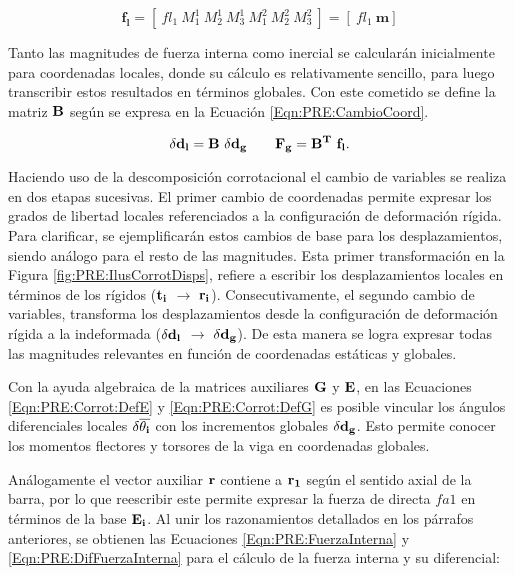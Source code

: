 \begin{equation}\label{Eqn:PRE:FuerzElem}
\boldsymbol{f_l} =[~fl_1 ~M^1_1~ M^1_2~ M^1_3~ M^2_1~ M^2_2~ M^2_3~] = [~fl_1~\boldsymbol{m}]
\end{equation}

Tanto las magnitudes de fuerza interna como inercial se calcularán inicialmente para coordenadas locales, donde su cálculo es relativamente sencillo, para luego transcribir estos resultados en términos globales. Con este cometido se define la matriz $\bf{B}$ según se expresa en la Ecuación \eqref{Eqn:PRE:CambioCoord}. 

\begin{equation}\label{Eqn:PRE:CambioCoord}
	\bf{\delta d_l}=\bf{B}~\bf{\delta d_g} ~~~~~~ \bf{ F_g}=\bf{B}^T~\bf{ f_l}.
\end{equation}


Haciendo uso de la descomposición corrotacional el cambio de variables se realiza en dos etapas sucesivas. El primer cambio de coordenadas permite expresar los grados de libertad locales referenciados a la configuración de deformación rígida. Para clarificar, se ejemplificarán estos cambios de base para los desplazamientos, siendo análogo para el resto de las magnitudes. Esta primer transformación en la Figura \ref{fig:PRE:IlusCorrotDisps}, refiere a escribir los desplazamientos locales en términos de los rígidos ($\bf{t_i}$ $\rightarrow$ $\bf{r_i}$). Consecutivamente, el segundo cambio de variables, transforma los desplazamientos desde la configuración de deformación rígida a la indeformada ($\delta \bf{d_l}$ $\rightarrow$ $\delta \bf{d_g}$). De esta manera se logra expresar todas las magnitudes relevantes en función de coordenadas estáticas y globales. 

Con la ayuda algebraica de la matrices auxiliares $\bf{G}$ y $\bf{E}$, en las Ecuaciones \eqref{Eqn:PRE:Corrot:DefE} y \eqref{Eqn:PRE:Corrot:DefG} es posible vincular los ángulos diferenciales locales $\delta\bf{\overline{\theta_i}}$ con los incrementos globales $\delta \bf{d_g}$. Esto permite conocer los momentos flectores y torsores de la viga en coordenadas globales.

Análogamente el vector auxiliar $\bf{r}$ contiene a $\bf{r}_1$ según el sentido axial de la barra, por lo que reescribir este permite expresar la fuerza de directa $fa1$  en términos de la base $\bf{E_i}$. Al unir los razonamientos detallados en los párrafos anteriores, se obtienen las Ecuaciones \eqref{Eqn:PRE:FuerzaInterna} y \eqref{Eqn:PRE:DifFuerzaInterna} para el cálculo de la fuerza interna y su diferencial:

